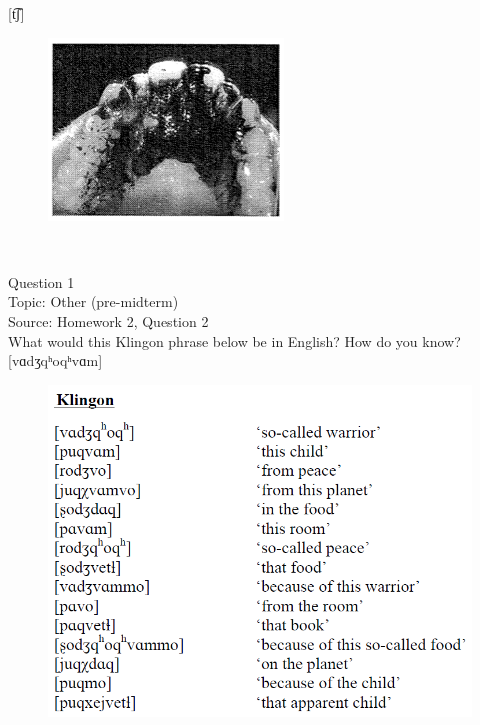 \documentclass[12pt]{article}
\begin{document}
{[t͡ʃ]}

\begin{figure}[H]
\includegraphics{../images/staticpalatography_stop.png}
\end{figure}

\newpage

\begin{center}
\textbf{{\color{red}{\HUGE END OF EXAM}}}\\

\end{center}
\newpage

\begin{center}
\textbf{{\color{blue}{\HUGE START OF EXAM\\}}}

\textbf{{\color{blue}{\HUGE Student ID: 12377\\}}}

\textbf{{\color{blue}{\HUGE 4:40\\}}}

\end{center}
\newpage

{\large Question 1}\\

Topic: Other (pre-midterm)\\
Source: Homework 2, Question 2\\

What would this Klingon phrase below be in English? How do you know?\\

{[vɑdʒqʰoqʰvɑm]}

\begin{figure}[H]
\includegraphics{../images/klingon.png}
\end{figure}
\end{document}
